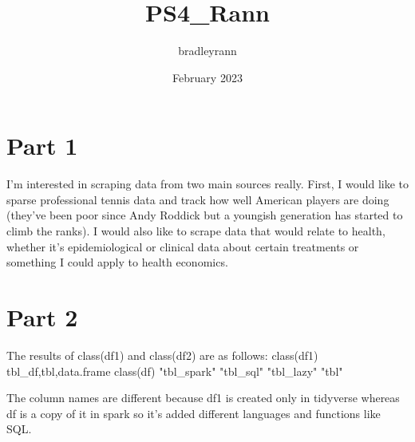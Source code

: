 \documentclass{article}
\title{PS4_Rann}
\author{bradleyrann }
\date{February 2023}
\begin{document}
\maketitle

\section{Part 1}
I'm interested in scraping data from two main sources really. First, I would like to sparse professional tennis data and track how well American players are doing (they've been poor since Andy Roddick but a youngish generation has started to climb the ranks). I would also like to scrape data that would relate to health, whether it's epidemiological or clinical data about certain treatments or something I could apply to health economics.

\section{Part 2}

The results of class(df1) and class(df2) are as follows:
class(df1)
tbl\_df,tbl,data.frame
class(df)
"tbl\_spark" "tbl\_sql"   "tbl\_lazy"  "tbl"

The column names are different because df1 is created only in tidyverse whereas df is a copy of it in spark so it's added different languages and functions like SQL.
\end{document}
